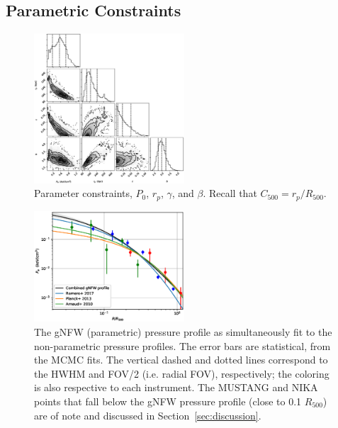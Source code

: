 \documentclass[twocolumn,traditabstract]{aa}
\begin{document}

\subsection{Parametric Constraints}

\begin{figure}[!h]
  \centering
  \includegraphics[width=0.5\textwidth]{NIKA_ml_deproj_figs/Real_Joint_gNFW_Real_11011111_2500S_500B_100W_contour_p16cosmo.eps}
  \caption{Parameter constraints, $P_0$, $r_p$, $\gamma$, and $\beta$. Recall that $C_{500} = r_p / R_{500}$.}
  \label{fig:joint_constraints}
\end{figure}
\begin{figure}[!h]
  \centering
  \includegraphics[width=0.5\textwidth]{NIKA_ml_deproj_figs/Real_Joint_gNFW_Real_11011111_2500S_500B_100W_gNFW_pressure_w_NP_pts_v2.eps}
  \caption{The gNFW (parametric) pressure profile as simultaneously fit to the non-parametric pressure profiles.
    The error bars are statistical,
    from the MCMC fits. The vertical dashed and dotted
    lines correspond to the HWHM and FOV/2 (i.e. radial FOV), respectively; the coloring is also respective to each
    instrument. The MUSTANG and NIKA points that fall below the gNFW pressure profile (close to 0.1 $R_{500}$) are of
    note and discussed in Section~\ref{sec:discussion}.}
  \label{fig:joint_pressure}
\end{figure}
\end{document}
